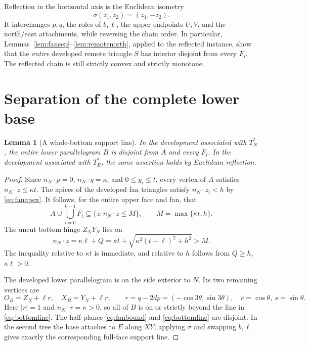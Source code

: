 \documentclass[11pt]{amsart}
\newtheorem{lemma}[theorem]{Lemma}
\begin{document}
Reflection in the horizontal axis is the Euclidean isometry
\[
 \sigma(z_1,z_2)=(z_1,-z_2).
\]
It interchanges \(p,q\), the roles of \(b,\ell\), the upper endpoints \(U,V\), and the north/east attachments, while reversing the chain order. In particular, Lemmas~\ref{lem:fansep}--\ref{lem:remotenorth}, applied to the reflected instance, show that the \emph{entire} developed remote triangle \(S\) has interior disjoint from every \(F_i\). The reflected chain is still strictly convex and strictly monotone.

\section{Separation of the complete lower base}
\begin{lemma}[A whole-bottom support line]\label{lem:bottom}
In the development associated with \(T_N^*\), the entire lower parallelogram \(B\) is disjoint from \(A\) and every \(F_i\). In the development associated with \(T_E^*\), the same assertion holds by Euclidean reflection.
\end{lemma}
\begin{proof}
Since \(n_N\cdot p=0\), \(n_N\cdot q=\kappa\), and \(0\le y_i\le t\), every vertex of \(A\) satisfies \(n_N\cdot z\le\kappa t\). The apices of the developed fan triangles satisfy \(n_N\cdot z_i<h\) by \eqref{eq:fanapex}. It follows, for the entire upper face and fan, that
\begin{equation}\label{eq:fanbound}
 A\cup\bigcup_{i=0}^{k-1} F_i
 \subseteq\{z:n_N\cdot z\le M\},\qquad M=\max\{\kappa t,h\}.
\end{equation}
The uncut bottom hinge \(Z_NY_N\) lies on
\begin{equation}\label{eq:bottomline}
 n_N\cdot z=\kappa\ell+Q
 =\kappa t+\sqrt{\kappa^2(t-\ell)^2+h^2}>M.
\end{equation}
The inequality relative to \(\kappa t\) is immediate, and relative to \(h\) follows from \(Q\ge h\), \(\kappa\ell>0\).

The developed lower parallelogram is on the side exterior to \(N\). Its two remaining vertices are
\begin{equation}\label{eq:bottompoints}
 O_B=Z_N+\ell r,\quad X_B=Y_N+\ell r,\qquad
 r=q-2dp=(-\cos3\theta,\sin3\theta),\quad
 c=\cos\theta,\ s=\sin\theta.
\end{equation}
Here \(|r|=1\) and \(n_N\cdot r=\kappa>0\), so all of \(B\) is on or strictly beyond the line in \eqref{eq:bottomline}. The half-planes \eqref{eq:fanbound} and \eqref{eq:bottomline} are disjoint. In the second tree the base attaches to \(E\) along \(XY\); applying \(\sigma\) and swapping \(b,\ell\) gives exactly the corresponding full-face support line.
\end{proof}
\end{document}
